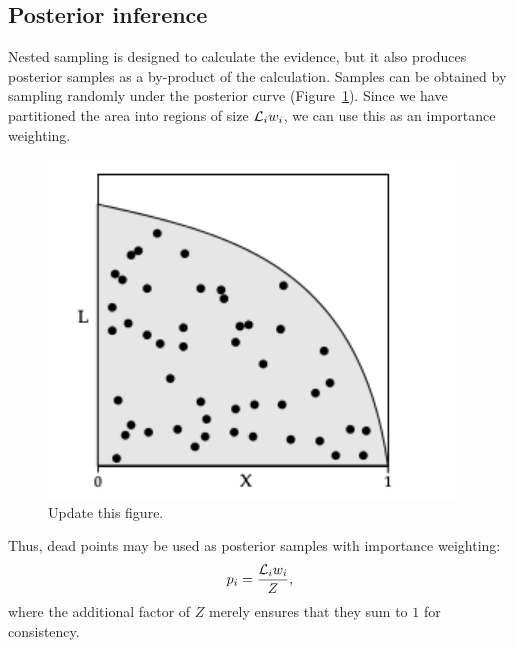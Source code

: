 \subsection{Posterior inference}
Nested sampling is designed to calculate the evidence, but it also produces posterior samples as a by-product of the calculation. Samples can be obtained by sampling randomly under the posterior curve (Figure~\ref{fig:bay:posterior}). Since we have partitioned the area into regions of size $\mathcal{L}_i w_i$, we can use this as an importance weighting.

\begin{figure}
  \centering
  \includegraphics[width=\textwidth]{chapter_bayesian_inference/figures/skilling}
  \caption{%
    Update this figure.\label{fig:bay:posterior}
}
\end{figure}

Thus, dead points may be used as posterior samples with importance weighting:
\begin{equation}
  p_i = \frac{\mathcal{L}_i w_i}{Z},
  \label{eqn:bay:posterior_weight}
\end{equation}
where the additional factor of $Z$ merely ensures that they sum to $1$ for consistency.



